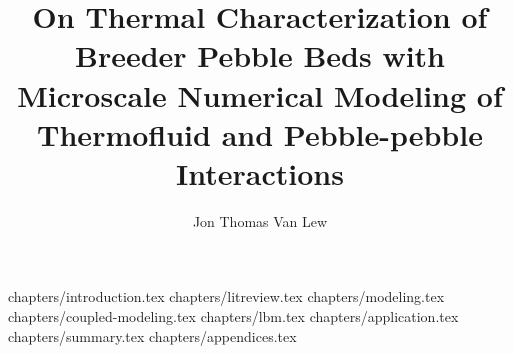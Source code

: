 \documentclass [PhD] {uclathes}
\title      {On Thermal Characterization of Breeder Pebble Beds with Microscale Numerical Modeling of Thermofluid and Pebble-pebble Interactions}
\author     {Jon Thomas Van Lew}
\begin{document}
\makeintropages
		{chapters/introduction.tex}
		{chapters/litreview.tex}
		{chapters/modeling.tex}
		{chapters/coupled-modeling.tex}
		{chapters/lbm.tex}
		{chapters/application.tex}
		{chapters/summary.tex}
		{chapters/appendices.tex}


\end{document}
